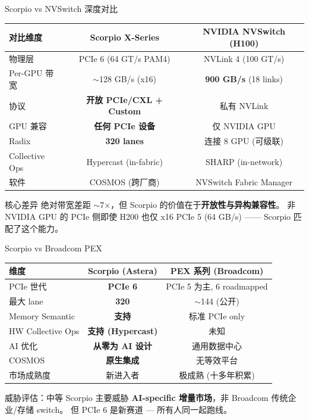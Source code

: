 \documentclass[aspectratio=169, 10pt, UTF8]{ctexbeamer}
\begin{document}
\begin{frame}{Scorpio vs NVSwitch 深度对比}
  \begin{table}[h]
    \centering
    \begin{tabular}{lcc}
      \toprule
      \textbf{对比维度} & \textbf{Scorpio X-Series} & \textbf{NVIDIA NVSwitch (H100)} \\
      \midrule
      物理层 & PCIe 6 (64 GT/s PAM4) & NVLink 4 (100 GT/s) \\
      Per-GPU 带宽 & $\sim$128 GB/s (x16) & \textbf{900 GB/s} (18 links) \\
      协议 & \textbf{开放 PCIe/CXL + Custom} & 私有 NVLink \\
      GPU 兼容 & \textbf{任何 PCIe 设备} & 仅 NVIDIA GPU \\
      Radix & \textbf{320 lanes} & 连接 8 GPU (可级联) \\
      Collective Ops & Hypercast (in-fabric) & SHARP (in-network) \\
      软件 & COSMOS (跨厂商) & NVSwitch Fabric Manager \\
      \bottomrule
    \end{tabular}
  \end{table}

  \begin{exampleblock}{核心差异}
    绝对带宽差距 $\sim$7$\times$，但 Scorpio 的价值在于\textbf{开放性与异构兼容性}。
    非 NVIDIA GPU 的 PCIe 侧即使 H200 也仅 x16 PCIe 5 (64 GB/s) —— Scorpio 匹配了这个能力。
  \end{exampleblock}
\end{frame}

\begin{frame}{Scorpio vs Broadcom PEX}
  \begin{table}[h]
    \centering
    \begin{tabular}{lcc}
      \toprule
      \textbf{维度} & \textbf{Scorpio (Astera)} & \textbf{PEX 系列 (Broadcom)} \\
      \midrule
      PCIe 世代 & \textbf{PCIe 6} & PCIe 5 为主, 6 roadmapped \\
      最大 lane & \textbf{320} & $\sim$144 (公开) \\
      Memory Semantic & \textbf{支持} & 标准 PCIe only \\
      HW Collective Ops & \textbf{支持 (Hypercast)} & 未知 \\
      AI 优化 & \textbf{从零为 AI 设计} & 通用数据中心 \\
      COSMOS & \textbf{原生集成} & 无等效平台 \\
      市场成熟度 & 新进入者 & 极成熟 (十多年积累) \\
      \bottomrule
    \end{tabular}
  \end{table}

  \begin{alertblock}{威胁评估：中等}
    Scorpio 主要威胁 \textbf{AI-specific 增量市场}，非 Broadcom 传统企业/存储 switch。
    但 PCIe 6 是新赛道 — 所有人同一起跑线。
  \end{alertblock}
\end{frame}
\end{document}
